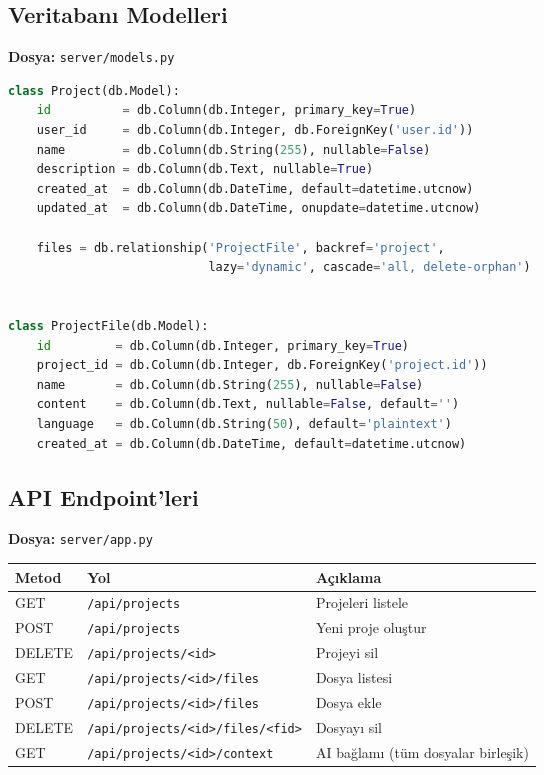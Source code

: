 \documentclass[12pt,a4paper]{article}
\begin{document}
\subsection{Veritabanı Modelleri}

\textbf{Dosya:} \texttt{server/models.py}

\begin{lstlisting}[language=Python, caption={Project ve ProjectFile modelleri}]
class Project(db.Model):
    id          = db.Column(db.Integer, primary_key=True)
    user_id     = db.Column(db.Integer, db.ForeignKey('user.id'))
    name        = db.Column(db.String(255), nullable=False)
    description = db.Column(db.Text, nullable=True)
    created_at  = db.Column(db.DateTime, default=datetime.utcnow)
    updated_at  = db.Column(db.DateTime, onupdate=datetime.utcnow)

    files = db.relationship('ProjectFile', backref='project',
                            lazy='dynamic', cascade='all, delete-orphan')


class ProjectFile(db.Model):
    id         = db.Column(db.Integer, primary_key=True)
    project_id = db.Column(db.Integer, db.ForeignKey('project.id'))
    name       = db.Column(db.String(255), nullable=False)
    content    = db.Column(db.Text, nullable=False, default='')
    language   = db.Column(db.String(50), default='plaintext')
    created_at = db.Column(db.DateTime, default=datetime.utcnow)
\end{lstlisting}

\subsection{API Endpoint'leri}

\textbf{Dosya:} \texttt{server/app.py}

\begin{tabular}{llp{7cm}}
\toprule
\textbf{Metod} & \textbf{Yol} & \textbf{Açıklama} \\
\midrule
GET    & \texttt{/api/projects}                   & Projeleri listele \\
POST   & \texttt{/api/projects}                   & Yeni proje oluştur \\
DELETE & \texttt{/api/projects/<id>}              & Projeyi sil \\
GET    & \texttt{/api/projects/<id>/files}        & Dosya listesi \\
POST   & \texttt{/api/projects/<id>/files}        & Dosya ekle \\
DELETE & \texttt{/api/projects/<id>/files/<fid>} & Dosyayı sil \\
GET    & \texttt{/api/projects/<id>/context}      & AI bağlamı (tüm dosyalar birleşik) \\
\bottomrule
\end{tabular}
\end{document}
